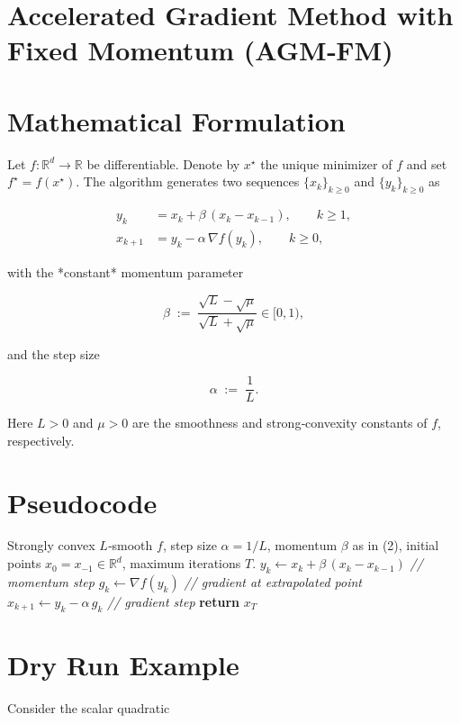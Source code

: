 \documentclass{article}
\begin{document}
\section*{Accelerated Gradient Method with Fixed Momentum (AGM‑FM)}

\section*{Mathematical Formulation}
Let $f:\mathbb{R}^{d}\rightarrow\mathbb{R}$ be differentiable.  
Denote by $x^{\star}$ the unique minimizer of $f$ and set $f^{\star}=f(x^{\star})$.
The algorithm generates two sequences $\{x_{k}\}_{k\ge 0}$ and $\{y_{k}\}_{k\ge 0}$ as  

\[
\boxed{
\begin{aligned}
y_{k}&=x_{k}+ \beta\,(x_{k}-x_{k-1}), \qquad k\ge 1,\\[2mm]
x_{k+1}&= y_{k}-\alpha\,\nabla f(y_{k}), \qquad k\ge 0,
\end{aligned}}
\tag{1}
\]

with the *constant* momentum parameter  

\[
\beta \;:=\; \frac{\sqrt{L}-\sqrt{\mu}}{\sqrt{L}+\sqrt{\mu}}\in[0,1),
\tag{2}
\]

and the step size  

\[
\alpha \;:=\; \frac{1}{L}.
\tag{3}
\]

Here $L>0$ and $\mu>0$ are the smoothness and strong‑convexity constants of $f$,
respectively.

\section*{Pseudocode}
\begin{algorithm}[H]
\caption{Accelerated Gradient Method with Fixed Momentum}
\begin{algorithmic}[1]
\Require Strongly convex $L$‑smooth $f$, step size $\alpha=1/L$, momentum $\beta$ as in (2),
initial points $x_{0}=x_{-1}\in\mathbb{R}^{d}$, maximum iterations $T$.
    \State $y_{k}\gets x_{k}+ \beta\,(x_{k}-x_{k-1})$ \hfill\textit{// momentum step}
    \State $g_{k}\gets \nabla f(y_{k})$ \hfill\textit{// gradient at extrapolated point}
    \State $x_{k+1}\gets y_{k}-\alpha\,g_{k}$ \hfill\textit{// gradient step}
\EndFor
\State \textbf{return} $x_{T}$
\end{algorithmic}
\end{algorithm}

\section*{Dry Run Example}
Consider the scalar quadratic  
\end{document}
